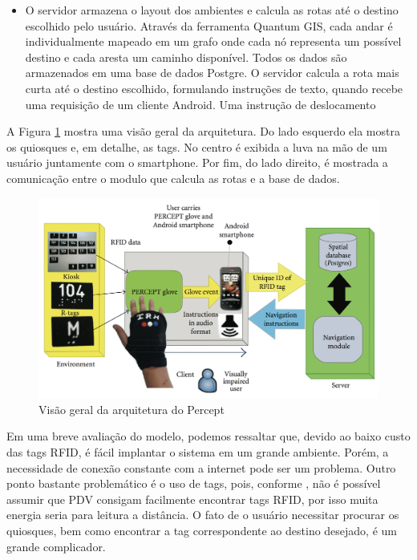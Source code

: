 \documentclass[english,brazilian]{UNISINOSmonografia}
\begin{document}
\begin{itemize}
	\item O servidor armazena o layout dos ambientes e calcula as rotas até o destino escolhido pelo usuário. Através da ferramenta Quantum GIS, cada andar é individualmente mapeado em um grafo onde cada nó representa um possível destino e cada aresta um caminho disponível. Todos os dados são armazenados em uma base de dados Postgre. O servidor calcula a rota mais curta até o destino escolhido, formulando instruções de texto, quando recebe uma requisição de um cliente Android. Uma instrução de deslocamento 
\end{itemize}

A Figura \ref{fig:visaoGeralPercept} mostra uma visão geral da arquitetura. Do lado esquerdo ela mostra os quiosques e, em detalhe, as tags. No centro é exibida a luva na mão de um usuário juntamente com o smartphone. Por fim, do lado direito, é mostrada a comunicação entre o modulo que calcula as rotas e a base de dados.


	\begin{figure}[!ht]
		\caption{Visão geral da arquitetura do Percept}
		\label{fig:visaoGeralPercept}
		\centering%
		\begin{minipage}{.9\textwidth}
			\includegraphics[width=\textwidth]{imgs/perceptArquitetura}
		\end{minipage}
	\end{figure}


Em uma breve avaliação do modelo, podemos ressaltar que, devido ao baixo custo das tags RFID, é fácil implantar o sistema em um grande ambiente. Porém, a necessidade de conexão constante com a internet pode ser um problema. Outro ponto bastante problemático é o uso de tags, pois, conforme , não é possível assumir que PDV consigam facilmente encontrar tags RFID, por isso muita energia seria para leitura a distância. O fato de o usuário necessitar procurar os quiosques, bem como encontrar a tag correspondente ao destino desejado, é um grande complicador.
\end{document}
